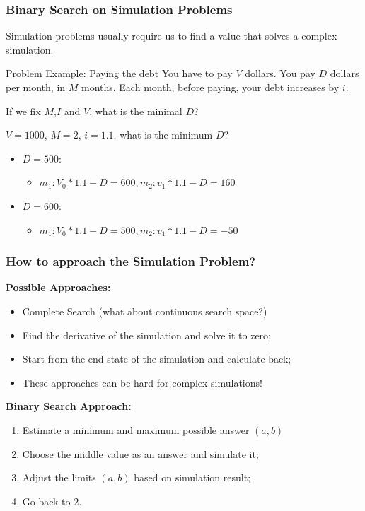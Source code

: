 \begin{frame}
  \frametitle{Binary Search on Simulation Problems}

  Simulation problems usually require us to find a value that solves
  a complex simulation.

  \begin{block}{Problem Example: Paying the debt}
    You have to pay $V$ dollars. You pay $D$ dollars per month, in $M$
    months. Each month, before paying, your debt increases by $i$.

    \medskip

    If we fix $M$,$I$ and $V$, what is the minimal $D$?
  \end{block}

  \bigskip

  $V = 1000$, $M = 2$, $i = 1.1$, what is the minimum $D$?

  \begin{itemize}
  \item $D = 500$:
    \begin{itemize}
    \item $m_1: V_0 *1.1 - D = 600, m_2: v_1*1.1 - D = 160$
    \end{itemize}
  \item $D = 600$:
    \begin{itemize}
    \item $m_1: V_0 *1.1 - D = 500, m_2: v_1*1.1 - D = -50$
    \end{itemize}
  \end{itemize}
\end{frame}

\begin{frame}
  \frametitle{How to approach the Simulation Problem?}

  {\bf Possible Approaches:}
  \begin{itemize}
  \item Complete Search (what about continuous search space?)
  \item Find the derivative of the simulation and solve it to zero;
  \item Start from the end state of the simulation and calculate back;
  \item \alert{These approaches can be hard for complex simulations!}
  \end{itemize}

  \bigskip

  {\bf Binary Search Approach:}
  \begin{enumerate}
  \item Estimate a minimum and maximum possible answer $(a,b)$
  \item Choose the middle value as an answer and simulate it;
  \item Adjust the limits $(a,b)$ based on simulation result;
  \item Go back to 2.
\end{enumerate}
\end{frame}

